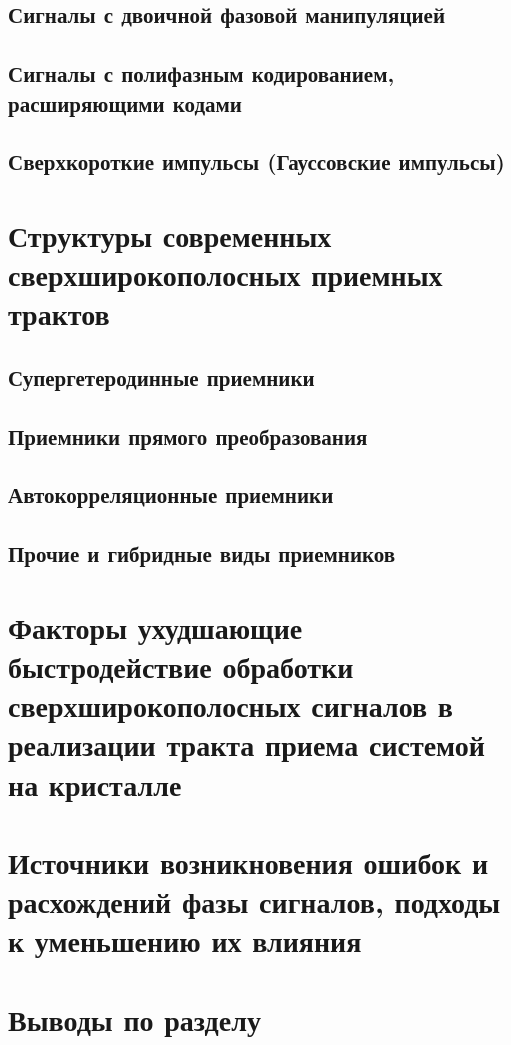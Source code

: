 \subsection{Сигналы с двоичной фазовой манипуляцией}

\subsection{Сигналы с полифазным кодированием, расширяющими кодами}

\subsection{Сверхкороткие импульсы (Гауссовские импульсы)}

\section{Структуры современных сверхширокополосных приемных трактов}

\subsection{Супергетеродинные приемники}

\subsection{Приемники прямого преобразования}

\subsection{Автокорреляционные приемники}

\subsection{Прочие и гибридные виды приемников}

\section{Факторы ухудшающие быстродействие обработки сверхширокополосных сигналов в реализации тракта приема системой на кристалле}

\section{Источники возникновения ошибок и расхождений фазы сигналов, подходы к уменьшению их влияния}

\section{Выводы по разделу}